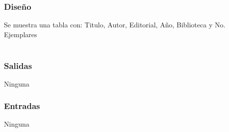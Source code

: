 \subsubsection{Diseño}
	Se muestra una tabla con: Titulo, Autor, Editorial, Año, Biblioteca y No. Ejemplares  \\\\


\subsubsection{Salidas}
	\begin{Citemize}
		\item Ninguna
	\end{Citemize}
	
\subsubsection{Entradas}
	\begin{Citemize}
		\item Ninguna
	\end{Citemize}